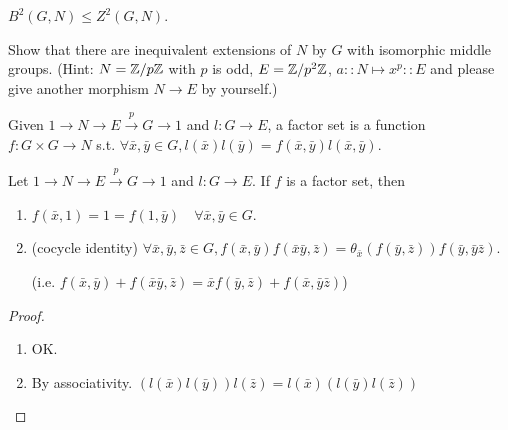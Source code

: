 \begin{exercise}
  $B^2(G, N) \le Z^2(G, N)$.
\end{exercise}
\begin{exercise}
  Show that there are inequivalent  extensions of $N$ by $G$ with isomorphic
  middle groups.
  (Hint: $N={\mathbb{Z}}/{p\mathbb{Z}}$ with $p$ is odd, $E={\mathbb{Z}}/{p^2\mathbb{Z}}$,
  $a:: N \mapsto x^p::E$ and please give another morphism $N\to E$ by yourself.)
\end{exercise}

\begin{definition}
  Given $1\to N\to E\xrightarrow{p} G\to 1$ and $l: G\to E$, a factor set is
  a function $f: G\times G \to N$ s.t.
  $\forall \bar{x}, \bar{y}\in G, l(\bar{x})l(\bar{y})
  = f(\bar{x}, \bar{y})l(\bar{x}, \bar{y})$.
\end{definition}

\begin{prop}
  Let $1\to N \to E\xrightarrow{p} G\to 1$ and $l: G\to E$.
  If $f$ is a factor set, then
  \begin{enumerate}[(1)]
    \item $f(\bar{x}, 1) = 1 = f(1, \bar{y}) \quad \forall \bar{x}, \bar{y}\in G$.
    \item (cocycle identity) $\forall \bar{x},\bar{y},\bar{z}\in G,
      f(\bar{x},\bar{y})f(\bar{x}\bar{y}, \bar{z})
      = \theta_{\bar{x}}(f(\bar{y}, \bar{z}))f(\bar{y}, \bar{y}\bar{z})$.

      (i.e. $f(\bar{x}, \bar{y}) + f(\bar{x}\bar{y},\bar{z})
      = \bar{x}f(\bar{y},\bar{z}) + f(\bar{x}, \bar{y}\bar{z})$)
  \end{enumerate}
  \begin{proof} \mbox{}
    \begin{enumerate}[(1)]
      \item OK.
      \item By associativity. $(l(\bar{x})l(\bar{y}))l(\bar{z}) = l(\bar{x})(l(\bar{y})l(\bar{z}))$
    \end{enumerate}
  \end{proof}
  \label{prop:factor-set}
\end{prop}

